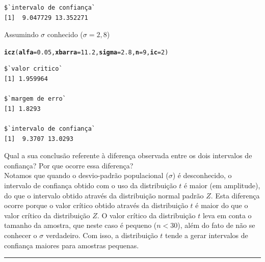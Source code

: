 \documentclass[a4paper,11pt,fleqn]{article}\usepackage[]{graphicx}\usepackage[]{color}
\makeatletter
\newcommand{\hlnum}[1]{\textcolor[rgb]{0,0,0}{#1}}%
\newcommand{\hlstd}[1]{\textcolor[rgb]{0,0,0}{#1}}%
\newcommand{\hlkwc}[1]{\textcolor[rgb]{0,0,0}{\textbf{#1}}}%
\newcommand{\hlkwd}[1]{\textcolor[rgb]{0,0,0}{\textbf{#1}}}%
\newenvironment{kframe}{%
 \def\at@end@of@kframe{}%
 \ifinner\ifhmode%
  \def\at@end@of@kframe{\end{minipage}}%
  \begin{minipage}{\columnwidth}%
 \fi\fi%
 \def\FrameCommand##1{\hskip\@totalleftmargin \hskip-\fboxsep
 \colorbox{shadecolor}{##1}\hskip-\fboxsep
     \hskip-\linewidth \hskip-\@totalleftmargin \hskip\columnwidth}%
 \MakeFramed {\advance\hsize-\width
   \@totalleftmargin\z@ \linewidth\hsize
   \@setminipage}}%
 {\par\unskip\endMakeFramed%
 \at@end@of@kframe}
\newenvironment{knitrout}{}{} %
\theoremstyle{definition}
\makeatother
\begin{document}
\begin{compactenum}[11.]
\begin{compactenum}
\begin{compactenum}
\begin{knitrout}
\begin{kframe}
\begin{verbatim}
$`intervalo de confiança`
[1]  9.047729 13.352271
\end{verbatim}
\end{kframe}
\end{knitrout}
    \item Assumindo $\sigma$ conhecido ($\sigma=2,8$)
\begin{knitrout}\small
{}\color{fgcolor}\begin{kframe}
\begin{alltt}
\hlkwd{icz}\hlstd{(}\hlkwc{alfa} \hlstd{=} \hlnum{0.05}\hlstd{,} \hlkwc{xbarra} \hlstd{=} \hlnum{11.2}\hlstd{,} \hlkwc{sigma} \hlstd{=} \hlnum{2.8}\hlstd{,} \hlkwc{n} \hlstd{=} \hlnum{9}\hlstd{,} \hlkwc{ic} \hlstd{=} \hlnum{2}\hlstd{)}
\end{alltt}
\begin{verbatim}
$`valor critico`
[1] 1.959964

$`margem de erro`
[1] 1.8293

$`intervalo de confiança`
[1]  9.3707 13.0293
\end{verbatim}
\end{kframe}
\end{knitrout}
    \end{compactenum}
    Qual a sua conclusão referente à diferença observada entre os dois
    intervalos de confiança? Por que ocorre essa diferença?\\
Notamos que quando o desvio-padrão populacional ($\sigma$) é
desconhecido, o intervalo de confiança obtido com o uso da distribuição
$t$ é maior (em amplitude), do que o intervalo obtido através da
distribuição normal padrão $Z$. Esta diferença ocorre porque o valor
crítico obtido através da distribuição $t$ é maior do que o valor
crítico da distribuição $Z$. O valor crítico da distribuição $t$ leva em
conta o tamanho da amostra, que neste caso é pequeno ($n<30$), além do
fato de não se conhecer o $\sigma$ verdadeiro. Com isso, a distribuição
$t$ tende a gerar intervalos de confiança maiores para amostras
pequenas.
  \end{compactenum}
\end{compactenum}

\vspace{0.3cm}
\hrule
\vspace{0.3cm}
\end{document}

